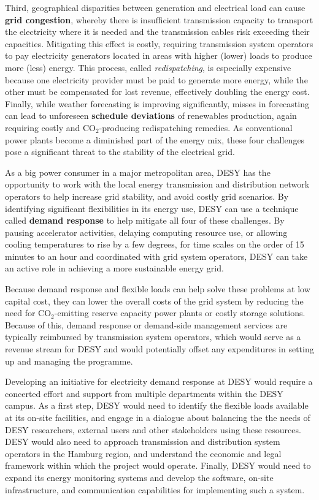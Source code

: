 \documentclass[11pt]{article}
\begin{document}
Third, geographical disparities between generation and electrical load can cause
\textbf{grid congestion}, whereby there is insufficient transmission capacity to transport the
electricity where it is needed and the transmission cables risk exceeding their
capacities. Mitigating this effect is costly, requiring transmission system operators to pay
electricity generators located in areas with higher (lower) loads to produce more (less) energy.
This process, called \textit{redispatching}, is especially expensive because one electricity
provider must be paid to generate more energy, while the other must be compensated for lost
revenue, effectively doubling the energy cost.
%
Finally, while weather forecasting is improving significantly, misses in forecasting
can lead to unforeseen \textbf{schedule deviations} of renewables production, again requiring
costly and CO$_2$-producing redispatching remedies. As conventional power plants become a
diminished part of the energy mix, these four challenges pose a significant threat to
the stability of the electrical grid.


As a big power consumer in a major metropolitan area, DESY has the opportunity to work with the
local energy transmission and distribution network operators to help increase grid stability,
and avoid costly grid scenarios. By identifying significant flexibilities in its energy use,
DESY can use a technique called \textbf{demand response} to help mitigate all four of these
challenges. By pausing accelerator activities, delaying computing resource use,
or allowing cooling temperatures to rise by a few degrees, for time scales on the order of 15
minutes to an hour and coordinated with grid system operators, DESY can take an active role in
achieving a more sustainable energy grid.

Because demand response and flexible loads can help
solve these problems at low capital cost, they can lower the overall costs of the grid system by
reducing the need for CO$_2$-emitting reserve capacity power plants or costly storage solutions.
Because of this, demand
response or demand-side management services are typically reimbursed by transmission system
operators, which would serve as a revenue stream for DESY and would potentially offset any
expenditures in setting up and managing the programme.

Developing an initiative for electricity demand response at DESY would require a concerted effort
and support from multiple departments within the DESY campus.
As a first step, DESY would need to identify the flexible loads available at its on-site facilities,
and engage in a dialogue about balancing the the needs of DESY researchers, external users and
other stakeholders using these resources.
DESY would also need to approach transmission and distribution system operators in the Hamburg
region, and understand the economic and legal framework within which the project would operate.
Finally, DESY would need to expand its energy monitoring systems and develop the software,
on-site infrastructure, and communication capabilities for implementing such a system.
\end{document}
